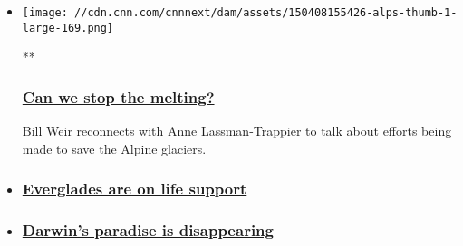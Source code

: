 \begin{itemize}
\item
  \href{/videos/world/2015/04/08/wonder-list-skype-alps-orig.cnn}{}

  \texttt{[image: //cdn.cnn.com/cnnnext/dam/assets/150408155426-alps-thumb-1-large-169.png]}

  **

  \hypertarget{can-we-stop-the-melting}{%
  \subsubsection{\texorpdfstring{\href{/videos/world/2015/04/08/wonder-list-skype-alps-orig.cnn}{Can
  we stop the
  melting?}}{Can we stop the melting?}}\label{can-we-stop-the-melting}}

  Bill Weir reconnects with Anne Lassman-Trappier to talk about efforts
  being made to save the Alpine glaciers.
\item
  \hypertarget{everglades-are-on-life-support}{%
  \subsubsection{\texorpdfstring{\href{/videos/world/2015/04/08/wonder-list-skype-everglades-orig.cnn}{Everglades
  are on life
  support}}{Everglades are on life support}}\label{everglades-are-on-life-support}}
\item
  \hypertarget{darwins-paradise-is-disappearing}{%
  \subsubsection{\texorpdfstring{\href{/videos/us/2015/03/04/wonder-list-skype-galapagos-orig-bill-weir.cnn}{Darwin's
  paradise is
  disappearing}}{Darwin's paradise is disappearing}}\label{darwins-paradise-is-disappearing}}
\end{itemize}

